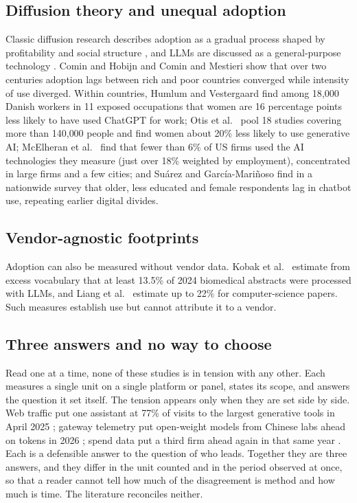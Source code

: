 \documentclass[11pt]{article}
\begin{document}
\subsection{Diffusion theory and unequal adoption} Classic diffusion research describes adoption as a gradual process shaped by profitability and social structure \cite{griliches1957hybrid,rogers2003diffusion}, and LLMs are discussed as a general-purpose technology \cite{bresnahan1995general,eloundou2024gpts}. Comin and Hobijn \cite{comin2010exploration} and Comin and Mestieri \cite{comin2018technology} show that over two centuries adoption lags between rich and poor countries converged while intensity of use diverged. Within countries, Humlum and Vestergaard \cite{humlum2025unequal} find among 18{,}000 Danish workers in 11 exposed occupations that women are 16 percentage points less likely to have used ChatGPT for work; Otis et al.\ \cite{otis2024global} pool 18 studies covering more than 140{,}000 people and find women about 20\% less likely to use generative AI; McElheran et al.\ \cite{mcelheran2024ai} find that fewer than 6\% of US firms used the AI technologies they measure (just over 18\% weighted by employment), concentrated in large firms and a few cities; and Su\'arez and Garc\'ia-Mari\~noso \cite{suarez2025verge} find in a nationwide survey that older, less educated and female respondents lag in chatbot use, repeating earlier digital divides.

\subsection{Vendor-agnostic footprints} Adoption can also be measured without vendor data. Kobak et al.\ \cite{kobak2025delving} estimate from excess vocabulary that at least 13.5\% of 2024 biomedical abstracts were processed with LLMs, and Liang et al.\ \cite{liang2025quantifying} estimate up to 22\% for computer-science papers. Such measures establish use but cannot attribute it to a vendor.

\subsection{Three answers and no way to choose}

Read one at a time, none of these studies is in tension with any other. Each measures a single unit on a single platform or panel, states its scope, and answers the question it set itself. The tension appears only when they are set side by side. Web traffic put one assistant at 77\% of visits to the largest generative tools in April 2025 \cite{liu2025who}; gateway telemetry put open-weight models from Chinese labs ahead on tokens in 2026 \cite{openrouter2026tokens,aubakirova2026state}; spend data put a third firm ahead again in that same year \cite{menlo2026state,ramp2026index}. Each is a defensible answer to the question of who leads. Together they are three answers, and they differ in the unit counted and in the period observed at once, so that a reader cannot tell how much of the disagreement is method and how much is time. The literature reconciles neither.
\end{document}
